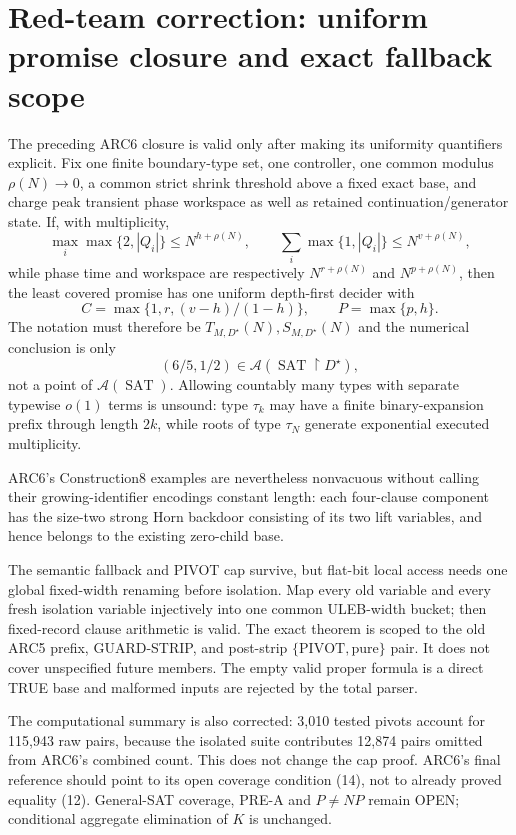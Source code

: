 \section{Red-team correction: uniform promise closure and exact fallback scope}

The preceding ARC6 closure is valid only after making its uniformity
quantifiers explicit.  Fix one finite boundary-type set, one controller, one
common modulus $\rho(N)\to0$, a common strict shrink threshold above a fixed
exact base, and charge peak transient phase workspace as well as retained
continuation/generator state.  If, with multiplicity,
\[
 \max_i\max\{2,|Q_i|\}\le N^{h+\rho(N)},\qquad
 \sum_i\max\{1,|Q_i|\}\le N^{v+\rho(N)},
\]
while phase time and workspace are respectively
$N^{r+\rho(N)}$ and $N^{p+\rho(N)}$, then the least covered promise has one
uniform depth-first decider with
\[
 C=\max\{1,r,(v-h)/(1-h)\},\qquad P=\max\{p,h\}.
\]
The notation must therefore be
$T_{M,D^\star}(N),S_{M,D^\star}(N)$ and the numerical conclusion is only
\[
 (6/5,1/2)\in\mathcal A(\operatorname{SAT}\upharpoonright D^\star),
\]
not a point of $\mathcal A(\operatorname{SAT})$.  Allowing countably many
types with separate typewise $o(1)$ terms is unsound: type $\tau_k$ may have
a finite binary-expansion prefix through length $2k$, while roots of type
$\tau_N$ generate exponential executed multiplicity.

ARC6's Construction8 examples are nevertheless nonvacuous without calling
their growing-identifier encodings constant length: each four-clause
component has the size-two strong Horn backdoor consisting of its two lift
variables, and hence belongs to the existing zero-child base.

The semantic fallback and PIVOT cap survive, but flat-bit local access needs
one global fixed-width renaming before isolation.  Map every old variable
and every fresh isolation variable injectively into one common ULEB-width
bucket; then fixed-record clause arithmetic is valid.  The exact theorem is
scoped to the old ARC5 prefix, GUARD-STRIP, and post-strip
$\{\mathrm{PIVOT},\mathrm{pure}\}$ pair.  It does not cover unspecified
future members.  The empty valid proper formula is a direct TRUE base and
malformed inputs are rejected by the total parser.

The computational summary is also corrected: 3,010 tested pivots account
for 115,943 raw pairs, because the isolated suite contributes 12,874 pairs
omitted from ARC6's combined count.  This does not change the cap proof.
ARC6's final reference should point to its open coverage condition (14), not
to already proved equality (12).  General-SAT coverage, PRE-A and
$P\ne NP$ remain OPEN; conditional aggregate elimination of $K$ is unchanged.

